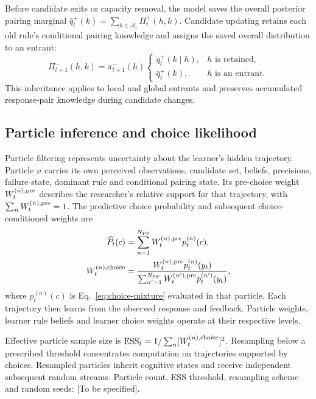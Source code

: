 Before candidate exits or capacity removal, the model saves the overall posterior pairing marginal $\bar q_t^+(k)=\sum_{h\in\mathcal A_t}\Pi_t^+(h,k)$. Candidate updating retains each old rule's conditional pairing knowledge and assigns the saved overall distribution to an entrant:
\begin{equation}
\Pi_{t+1}^-(h,k)=\pi_{t+1}^-(h)
\begin{cases}
q_t^+(k\mid h),&h\text{ is retained},\\
\bar q_t^+(k),&h\text{ is an entrant}.
\end{cases}
\label{eq:pairing-state-transfer}
\end{equation}
This inheritance applies to local and global entrants and preserves accumulated response-pair knowledge during candidate changes.

\subsection*{Particle inference and choice likelihood}
\label{m:inference}

Particle filtering represents uncertainty about the learner's hidden trajectory. Particle $n$ carries its own perceived observations, candidate set, beliefs, precisions, failure state, dominant rule and conditional pairing state. Its pre-choice weight $W_t^{(n),{\rm pre}}$ describes the researcher's relative support for that trajectory, with $\sum_nW_t^{(n),{\rm pre}}=1$. The predictive choice probability and subsequent choice-conditioned weights are
\begin{align}
\widehat P_t(c)&=\sum_{n=1}^{N_{\rm PF}}W_t^{(n),{\rm pre}}p_t^{(n)}(c),\\
W_t^{(n),{\rm choice}}&=
\frac{W_t^{(n),{\rm pre}}p_t^{(n)}(y_t)}
{\sum_{n'=1}^{N_{\rm PF}}W_t^{(n'),{\rm pre}}p_t^{(n')}(y_t)},
\label{eq:particle-prediction}
\end{align}
where $p_t^{(n)}(c)$ is Eq.~\ref{eq:choice-mixture} evaluated in that particle. Each trajectory then learns from the observed response and feedback. Particle weights, learner rule beliefs and learner choice weights operate at their respective levels.

Effective particle sample size is $\mathrm{ESS}_t=1/\sum_n[W_t^{(n),{\rm choice}}]^2$. Resampling below a prescribed threshold concentrates computation on trajectories supported by choices. Resampled particles inherit cognitive states and receive independent subsequent random streams. Particle count, ESS threshold, resampling scheme and random seeds: [To be specified].

